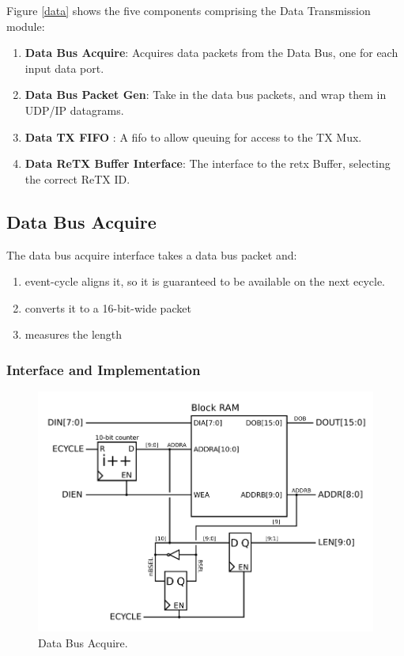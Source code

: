 Figure \ref{data} shows the five components comprising the Data Transmission module: 
\begin{enumerate}
\item \textbf{Data Bus Acquire}: Acquires data packets from the Data
  Bus, one for each input data port.
\item \textbf{Data Bus Packet Gen}: Take in the data bus packets, and
  wrap them in UDP/IP datagrams.
\item \textbf{Data TX FIFO} : A fifo to allow queuing for access to
  the TX Mux.
\item \textbf{Data ReTX Buffer Interface}: The interface to the retx
  Buffer, selecting the correct ReTX ID.
\end{enumerate}


\subsection{Data Bus Acquire}
The data bus acquire interface takes a data bus packet and: 

\begin{enumerate}
\item event-cycle aligns it, so it is guaranteed to be available on the
   next ecycle.
\item converts it to a 16-bit-wide packet
\item measures the length
\end{enumerate}

\subsubsection{Interface and Implementation} 
 \begin{figure}
\begin{centering}
\includegraphics[scale=0.8]{data.acquire.svg}
\end{centering}
\caption{Data Bus Acquire.}
\label{data.acquire}
\end{figure}

